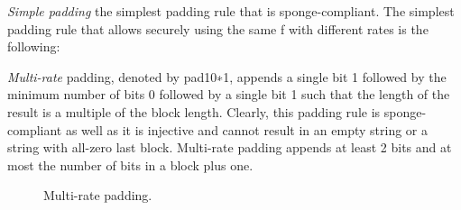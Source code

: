 \emph{Simple padding} the simplest padding rule that is sponge-compliant. The simplest padding rule that allows securely using the same f with different rates is the following:
\begin{defn} \emph{Multi-rate} padding, denoted by pad10∗1, appends a single bit 1 followed by the minimum number of bits 0 followed by a single bit 1 such that the length of the result is a multiple of the block length.
Clearly, this padding rule is sponge-compliant as well as it is injective and cannot result in an empty string or a string with all-zero last block. Multi-rate padding appends at least 2 bits and at most the number of bits in a block plus one.
\end{defn}


\begin{figure}[H]
  \centering
  \caption{\label{fig:MultiPadding}Multi-rate padding.}
\end{figure}

